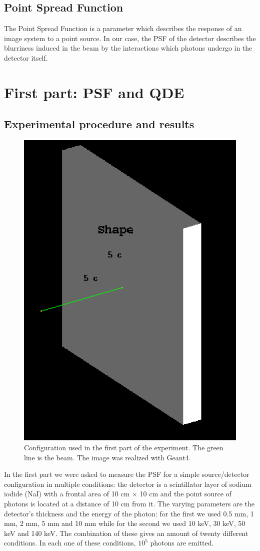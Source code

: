 \documentclass[a4paper]{article}
\begin{document}
\subsection{Point Spread Function}
The Point Spread Function is a parameter which describes the response of an image system to a point source. In our case, the PSF of the detector describes the blurriness induced in the beam by the interactions which photons undergo in the detector itself.

\section{First part: PSF and QDE}
\subsection{Experimental procedure and results}
\begin{figure}[H]
  \centering
  \includegraphics[width=0.4\columnwidth]{detector1.png}
  \caption{Configuration used in the first part of the experiment. The green line is the beam. The image was realized with Geant4.}
  \label{fig:conf1}
\end{figure}

In the first part we were asked to measure the PSF for a simple source/detector configuration in multiple conditions: the detector is a scintillator layer of sodium iodide (NaI) with a frontal area of 10 cm $\times$ 10 cm and the point source of photons is located at a distance of 10 cm from it. The varying parameters are the detector's thickness and the energy of the photon: for the first we used 0.5 mm, 1 mm, 2 mm, 5 mm and 10 mm while for the second we used 10 keV, 30 keV, 50 keV and 140 keV. The combination of these gives an amount of twenty different conditions. In each one of these conditions, $10^5$ photons are emitted.
\end{document}
